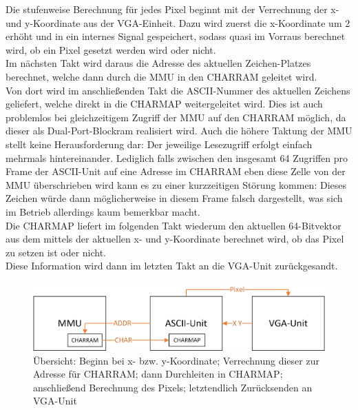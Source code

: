 Die stufenweise Berechnung f\"ur jedes Pixel beginnt mit der Verrechnung der x- und y-Koordinate aus der VGA-Einheit. Dazu wird zuerst die x-Koordinate um 2 erh\"oht und in ein internes Signal gespeichert, sodass quasi im Vorraus berechnet wird, ob ein Pixel gesetzt werden wird oder nicht.\\
Im n\"achsten Takt wird daraus die Adresse des aktuellen Zeichen-Platzes berechnet, welche dann durch die MMU in den CHARRAM geleitet wird.\\
Von dort wird im anschlie\ss{}enden Takt die ASCII-Nummer des aktuellen Zeichens geliefert, welche direkt in die CHARMAP weitergeleitet wird. Dies ist auch problemlos bei gleichzeitigem Zugriff der MMU auf den CHARRAM m\"oglich, da dieser als Dual-Port-Blockram realisiert wird. Auch die h\"ohere Taktung der MMU stellt keine Herausforderung dar: Der jeweilige Lesezugriff erfolgt einfach mehrmals hintereinander. Lediglich falls zwischen den insgesamt 64 Zugriffen pro Frame der ASCII-Unit auf eine Adresse im CHARRAM eben diese Zelle von der MMU \"uberschrieben wird kann es zu einer kurzzeitigen St\"orung kommen: Dieses Zeichen w\"urde dann m\"oglicherweise in diesem Frame falsch dargestellt, was sich im Betrieb allerdings kaum bemerkbar macht.\\
Die CHARMAP liefert im folgenden Takt wiederum den aktuellen 64-Bitvektor aus dem mittels der aktuellen x- und y-Koordinate berechnet wird, ob das Pixel zu setzen ist oder nicht.\\
Diese Information wird dann im letzten Takt an die VGA-Unit zurückgesandt.
\begin{figure}[H]
	\centering
		\includegraphics[width=1.0\textwidth]{ASCII.png}
	\caption{\"Ubersicht: Beginn bei x- bzw. y-Koordinate; Verrechnung dieser zur Adresse f\"ur CHARRAM; dann Durchleiten in CHARMAP; anschlie\ss{}end Berechnung des Pixels; letztendlich Zur\"ucksenden an VGA-Unit}
	\label{fig:pixels}
\end{figure}


